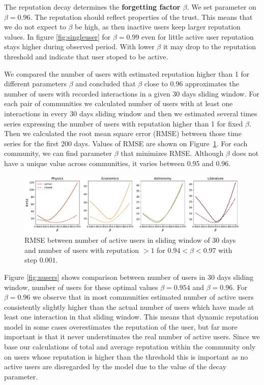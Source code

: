 The reputation decay determines the \textbf{forgetting factor $\beta$}. We set parameter on $\beta=0.96$. The reputation should reflect properties of the trust. This means that we do not expect to $\beta$ be high, as then inactive users keep larger reputation values. In figure \ref{fig:singleuser} for $\beta=0.99$ even for little active user reputation stays higher during observed period. With lower $\beta$ it may drop to the reputation threshold and indicate that user stoped to be active.  

We compared the number of users with estimated reputation higher than 1 for different parameters $\beta$ and concluded that $\beta$ close to $0.96$ approximates the number of users with recorded interactions in a given 30 days sliding window. For each pair of communities we calculated number of users with at least one interactions in every 30 days sliding window and then we estimated several times series expressing the number of users with reputation higher than 1 for fixed $\beta$. Then we calculated the root mean square error (RMSE) between those time series for the first 200 days. Values of RMSE are shown on Figure~\ref{fig:rmse}. For each community, we can find parameter $\beta$ that minimizes RMSE. Although $\beta$ does not have a unique value across communities, it varies between 0.95 and 0.96.  

\begin{figure}[h!]
	\centering
	\includegraphics[width=\linewidth]{figures/stackexchange/rmse.pdf}
	\caption[RMSE between number of users in 30 days sliding window and positive reputation.]{RMSE between number of active users in sliding window of 30 days and number of users with reputation $>1$ for  $0.94< \beta <0.97$ with step $0.001$. }
	\label{fig:rmse}
\end{figure}

Figure \ref{fig:nusers} shows comparison between number of users in 30 days sliding window, number of users for these optimal values $\beta = 0.954$ and $\beta =0.96$. For $\beta = 0.96$ we observe that in most communities estimated number of active users consistently slightly higher than the actual number of users which have made at least one interaction in that sliding window. This means that dynamic reputation model in some cases overestimates the reputation of the user, but far more important is that it never understimates the real number of active users. Since we base our calculations of total and average reputation within the community only on users whose reputation is higher than the threshold this is important as no active users are disregarded by the model due to the value of the decay parameter.

